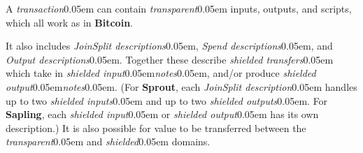 \documentclass{article}
\renewcommand{\emph}[1]{\hspace{0.15em}{\fontfamily{pnc}\selectfont\scalebox{1.02}[0.999]{\textit{#1}}}\hspace{0.02em}}
\newcommand{\crossref}[1]{\autoref{#1}\, \emph{`\nameref*{#1}\kern -0.05em'} on p.\,\pageref*{#1}}
\newcommand{\introlist}{\needspace{15ex}}
\newcommand{\hairspace}{~\!}
\newcommand{\sprout}[1]{}
\newcommand{\notsprout}[1]{#1}
\newcommand{\sprout}[1]{#1}
\newcommand{\notsprout}[1]{}
\numberwithin{theorem}{subsection}
\newcommand{\term}[1]{\textsl{#1}\kern 0.05em\xspace}
\newcommand{\termbf}[1]{\textbf{#1}\xspace}
\newcommand{\quotedterm}[1]{``~\!\!\term{#1}''}
\newcommand{\Zcash}{\termbf{Zcash}}
\newcommand{\Zerocash}{\termbf{Zerocash}}
\newcommand{\Sprout}{\termbf{Sprout}}
\newcommand{\Sapling}{\termbf{Sapling}}
\newcommand{\Bitcoin}{\termbf{Bitcoin}}
\newcommand{\notes}{\term{notes}}
\newcommand{\joinSplitDescription}{\term{JoinSplit description}}
\newcommand{\joinSplitDescriptions}{\term{JoinSplit descriptions}}
\newcommand{\joinSplitTransfer}{\term{JoinSplit transfer}}
\newcommand{\joinSplitTransfers}{\term{JoinSplit transfers}}
\newcommand{\shieldedTransfers}{\term{shielded transfers}}
\newcommand{\shieldedInput}{\term{shielded input}}
\newcommand{\shieldedInputs}{\term{shielded inputs}}
\newcommand{\spendDescriptions}{\term{Spend descriptions}}
\newcommand{\outputDescriptions}{\term{Output descriptions}}
\newcommand{\shieldedOutput}{\term{shielded output}}
\newcommand{\shieldedOutputs}{\term{shielded outputs}}
\newcommand{\transaction}{\term{transaction}}
\newcommand{\transactions}{\term{transactions}}
\newcommand{\transparent}{\term{transparent}}
\newcommand{\shielded}{\term{shielded}}
\begin{document}
\introlist
A \transaction can contain \transparent inputs, outputs, and scripts, which all
work as in \Bitcoin \cite{Bitc-Protocol}.
\sprout{
It also contains a sequence of zero or more \joinSplitDescriptions.
Each of these describes a \joinSplitTransfer\hairspace\footnote{
\joinSplitTransfers in \Zcash generalize \quotedterm{Mint} and \quotedterm{Pour}
\transactions in \Zerocash; see \crossref{trstructure} for differences.}
which takes in a \transparent value and up to two input \notes, and produces a
\transparent value and up to two output \notes.
}
\notsprout{
It also includes \joinSplitDescriptions, \spendDescriptions, and \outputDescriptions.
Together these describe \shieldedTransfers which take in \shieldedInput \notes,
and/or produce \shieldedOutput \notes.
(For \Sprout, each \joinSplitDescription handles up to two \shieldedInputs and
up to two \shieldedOutputs. For \Sapling, each \shieldedInput or \shieldedOutput
has its own description.)
It is also possible for value to be transferred between the \transparent and
\shielded domains.
}
\end{document}
